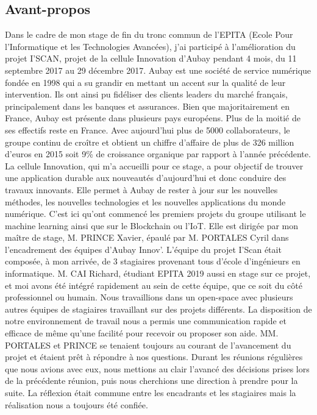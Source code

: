 \documentclass[12pt,a4paper]{article}
\begin{document}
\subsection{Avant-propos}
Dans le cadre de mon stage de fin du tronc commun de l’EPITA (Ecole Pour l’Informatique et les Technologies Avancées), j’ai participé à l’amélioration du projet I’SCAN, projet de la cellule Innovation d’Aubay pendant 4 mois, du 11 septembre 2017 au 29 décembre 2017.\bigbreak
Aubay est une société de service numérique fondée en 1998 qui a su grandir en mettant un accent sur la qualité de leur intervention. Ils ont ainsi pu fidéliser des clients leaders du marché français, principalement dans les banques et assurances. Bien que majoritairement en France, Aubay est présente dans plusieurs pays européens. Plus de la moitié de ses effectifs reste en France. Avec aujourd’hui plus de 5000 collaborateurs, le groupe continu de croître et obtient un chiffre d’affaire de plus de 326 million d’euros en 2015 soit 9\% de croissance organique par rapport à l’année précédente.\bigbreak
La cellule Innovation, qui m’a accueilli pour ce stage, a pour objectif de trouver une application durable aux nouveautés d’aujourd’hui et donc conduire des travaux innovants. Elle permet à Aubay de rester à jour sur les nouvelles méthodes, les nouvelles technologies et les nouvelles applications du monde numérique. C’est ici qu’ont commencé les premiers projets du groupe utilisant le machine learning ainsi que sur le Blockchain ou l’IoT. Elle est dirigée par mon maître de stage, M. PRINCE Xavier, épaulé par M. PORTALES Cyril dans l’encadrement des équipes d’Aubay Innov’.\bigbreak
L’équipe du projet I’Scan était composée, à mon arrivée, de 3 stagiaires provenant tous d’école d’ingénieurs en informatique. M. CAI Richard, étudiant EPITA 2019 aussi en stage sur ce projet, et moi avons été intégré rapidement au sein de cette équipe, que ce soit du côté professionnel ou humain. Nous travaillions dans un open-space avec plusieurs autres équipes de stagiaires travaillant sur des projets différents. La disposition de notre environnement de travail nous a permis une communication rapide et efficace de même qu’une facilité pour recevoir ou proposer son aide. MM. PORTALES et PRINCE se tenaient toujours au courant de l’avancement du projet et étaient prêt à répondre à nos questions. Durant les réunions régulières que nous avions avec eux, nous mettions au clair l’avancé des décisions prises lors de la précédente réunion, puis nous cherchions une direction à prendre pour la suite. La réflexion était commune entre les encadrants et les stagiaires mais la réalisation nous a toujours été confiée.\bigbreak
\end{document}
